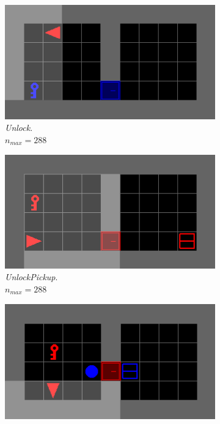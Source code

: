 \documentclass{article}
\begin{document}
\begin{figure}[H]
  \begin{subfigure}[b]{0.32\linewidth}
    \centering
    \includegraphics[width=\linewidth]{Tasks/BlockedUnlockPickup/Unlock}
    \caption{\textit{Unlock}.
    \\ \(n_{max}=288 \)}
  \end{subfigure}
  \hfill
  \begin{subfigure}[b]{0.32\linewidth}
    \centering
    \includegraphics[width=\linewidth]{Tasks/BlockedUnlockPickup/UnlockPickup}
    \caption{\textit{UnlockPickup}. \\
    \(n_{max}=288\)}
  \end{subfigure}
  \hfill
  \begin{subfigure}[b]{0.32\linewidth}
    \centering
    \includegraphics[width=\linewidth]{Tasks/BlockedUnlockPickup/BlockedUnlockPickup}

\end{subfigure}
\end{figure}
\end{document}

